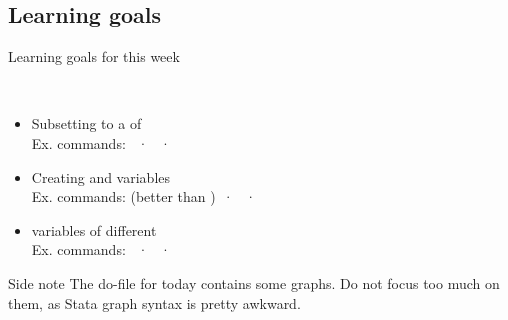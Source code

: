 \documentclass[t]{beamer}
\begin{document}
  \subsection{Learning goals}

 \begin{frame}[t]{Learning goals for this week}

   \\[1em]

	\begin{itemize}
		\item Subsetting to a  of \\[.5em]%
      Ex. commands:  ·  · \\[.5em]%
		\item Creating and  variables\\[.5em]%
      Ex. commands:  (better than ) ·  · \\[.5em]%
		\item {} variables of different \\[.5em]%
      Ex. commands:  ·  · \\[.5em]%
	\end{itemize}

    \begin{block}{Side note}
       The do-file for today contains some graphs. Do not focus too much on them, as Stata graph syntax is pretty awkward.%
    \end{block}

  \end{frame}
  
\end{document}
